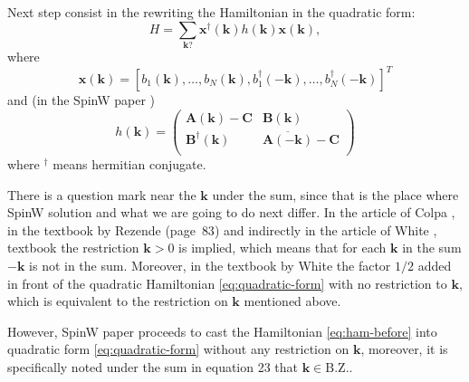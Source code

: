 \documentclass[a4paper,12pt]{article}
\begin{document}
        Next step consist in the rewriting the Hamiltonian in the quadratic form:
        \begin{equation}
            H = \sum_{\boldsymbol{k} ?} \boldsymbol{x}^{\dag}(\boldsymbol{k})h(\boldsymbol{k})\boldsymbol{x}(\boldsymbol{k}), \label{eq:quadratic-form}
        \end{equation}
        where
        \begin{equation}
            \boldsymbol{x}(\boldsymbol{k}) = \left[b_1(\boldsymbol{k}), \dots, b_N(\boldsymbol{k}), 
            b^{\dag}_1(-\boldsymbol{k}), \dots, b^{\dag}_N(-\boldsymbol{k})\right]^T
        \end{equation}
        and (in the SpinW paper \cite{toth2015linear})
        \begin{equation}
            h(\boldsymbol{k}) = 
            \begin{pmatrix}
                \boldsymbol{A}(\boldsymbol{k}) - \boldsymbol{C} & \boldsymbol{B}(\boldsymbol{k}) \\
                \boldsymbol{B}^{\dag}(\boldsymbol{k}) &\overline{\boldsymbol{A}(-\boldsymbol{k})} - \boldsymbol{C} \\
            \end{pmatrix} \label{eq:h-spinw}
        \end{equation}
        where $^{\dag}$ means hermitian conjugate.
        
        There is a question mark near the $\boldsymbol{k}$ under the sum, since that is the place where SpinW solution and what we are going to do next differ.
        In the article of Colpa \cite{colpa1978diagonalization}, in the textbook by Rezende \cite{rezende2020fundamentals} (page~$83$) 
        and indirectly in the article of White \cite{white1965diagonalization}, textbook \cite{jensen1991rare} the restriction $\boldsymbol{k} > 0$ is implied, 
        which means that for each $\boldsymbol{k}$ in the sum $-\boldsymbol{k}$ is not in the sum. 
        Moreover, in the textbook by White \cite{white1983quantum} 
        the factor $1/2$ added in front of the quadratic Hamiltonian \eqref{eq:quadratic-form} with no restriction to $\boldsymbol{k}$, 
        which is equivalent to the restriction on $\boldsymbol{k}$ mentioned above.

        However, SpinW paper \cite{toth2015linear} proceeds to cast the Hamiltonian \eqref{eq:ham-before} into quadratic form \eqref{eq:quadratic-form} without any restriction on $\boldsymbol{k}$,
        moreover, it is specifically noted under the sum in equation 23 that $\boldsymbol{k} \in \text{B.Z.}$. 
\end{document}
